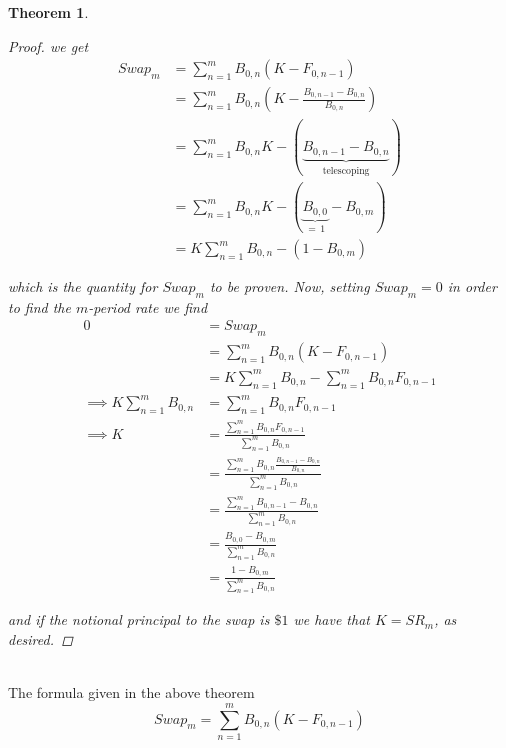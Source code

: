 \documentclass[12pt]{article}
\newtheorem{theorem}{Theorem}
\begin{document}
\begin{theorem}
\begin{proof}
we get
\begin{align*}
	Swap_m &= \sum^m_{n = 1} B_{0,n}(K - F_{0,n - 1}) \\
	&= \sum^m_{n = 1} B_{0,n} \left(K - \frac{ B_{0, n - 1} - B_{0, n} }{ B_{0, n} } \right) \\
	&= \sum^m_{n = 1} B_{0,n}K - (\underbrace{B_{0, n - 1} - B_{0,n}}_\text{telescoping}) \\
	&= \sum^m_{n = 1} B_{0,n}K - (\underbrace{B_{0,0}}_{=\,1} - B_{0,m}) \\
	&= K\sum^m_{n = 1} B_{0,n} - (1 - B_{0,m})
\end{align*}

which is the quantity for $Swap_m$ to be proven. Now, setting $Swap_m = 0$ in order to find the $m$-period rate we find
\begin{align*}
	0 &= Swap_m \\
	&= \sum^m_{n = 1} B_{0,n}(K - F_{0,n - 1}) \\
	&= K\sum^m_{n = 1} B_{0,n} - \sum^m_{n = 1} B_{0,n}F_{0,n - 1} \\
	\implies K\sum^m_{n = 1}B_{0,n} &= \sum^m_{n = 1} B_{0,n}F_{0,n - 1} \\
	\implies K &= \frac{ \sum^m_{n = 1} B_{0,n}F_{0,n - 1} }{ \sum^m_{n = 1} B_{0,n} } \\
	&= \frac{ \sum^m_{n = 1} B_{0,n} \frac{ B_{0, n - 1} - B_{0, n} }{ B_{0, n} } }{ \sum^m_{n = 1} B_{0,n} } \\
	&= \frac{ \sum^m_{n = 1} B_{0, n - 1} - B_{0, n} }{ \sum^m_{n = 1} B_{0,n} } \\
	&= \frac{ B_{0,0} - B_{0,m} }{ \sum^m_{n = 1} B_{0,n} } \\
	&= \frac{ 1 - B_{0,m} }{ \sum^m_{n = 1} B_{0,n} }
\end{align*}

and if the notional principal to the swap is $\$1$ we have that $K = SR_m$, as desired.
\end{proof}
\end{theorem} \hfill\\

The formula given in the above theorem
\begin{equation*}
	Swap_m = \sum^m_{n = 1} B_{0,n}(K - F_{0,n - 1}) 
\end{equation*}
\end{document}
